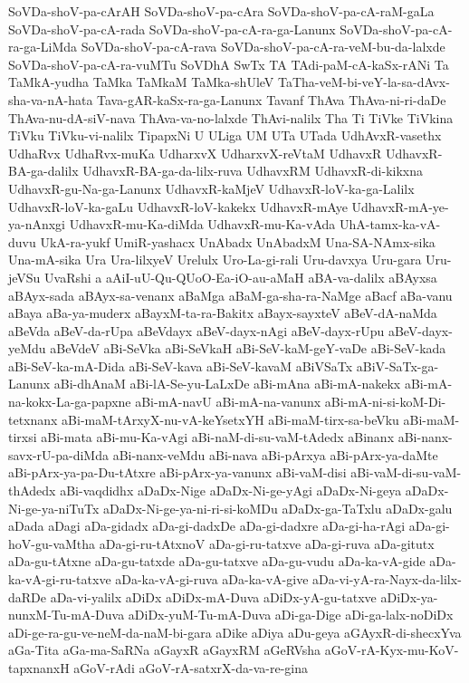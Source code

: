 {SoVDa-shoV-pa-cArAH
SoVDa-shoV-pa-cAra
SoVDa-shoV-pa-cA-raM-gaLa
SoVDa-shoV-pa-cA-rada
SoVDa-shoV-pa-cA-ra-ga-Lanunx
SoVDa-shoV-pa-cA-ra-ga-LiMda
SoVDa-shoV-pa-cA-rava
SoVDa-shoV-pa-cA-ra-veM-bu-da-lalxde
SoVDa-shoV-pa-cA-ra-vuMTu
SoVDhA
SwTx
TA
TAdi-paM-cA-kaSx-rANi
Ta
TaMkA-yudha
TaMka
TaMkaM
TaMka-shUleV
TaTha-veM-bi-veY-la-sa-dAvx-sha-va-nA-hata
Tava-gAR-kaSx-ra-ga-Lanunx
Tavanf
ThAva
ThAva-ni-ri-daDe
ThAva-nu-dA-siV-nava
ThAva-va-no-lalxde
ThAvi-nalilx
Tha
Ti
TiVke
TiVkina
TiVku
TiVku-vi-nalilx
TipapxNi
U
ULiga
UM
UTa
UTada
UdhAvxR-vasethx
UdhaRvx
UdhaRvx-muKa
UdharxvX
UdharxvX-reVtaM
UdhavxR
UdhavxR-BA-ga-dalilx
UdhavxR-BA-ga-da-lilx-ruva
UdhavxRM
UdhavxR-di-kikxna
UdhavxR-gu-Na-ga-Lanunx
UdhavxR-kaMjeV
UdhavxR-loV-ka-ga-Lalilx
UdhavxR-loV-ka-gaLu
UdhavxR-loV-kakekx
UdhavxR-mAye
UdhavxR-mA-ye-ya-nAnxgi
UdhavxR-mu-Ka-diMda
UdhavxR-mu-Ka-vAda
UhA-tamx-ka-vA-duvu
UkA-ra-yukf
UmiR-yashacx
UnAbadx
UnAbadxM
Una-SA-NAmx-sika
Una-mA-sika
Ura
Ura-lilxyeV
Urelulx
Uro-La-gi-rali
Uru-davxya
Uru-gara
Uru-jeVSu
UvaRshi
a
aAiI-uU-Qu-QUoO-Ea-iO-au-aMaH
aBA-va-dalilx
aBAyxsa
aBAyx-sada
aBAyx-sa-venanx
aBaMga
aBaM-ga-sha-ra-NaMge
aBacf
aBa-vanu
aBaya
aBa-ya-muderx
aBayxM-ta-ra-Bakitx
aBayx-sayxteV
aBeV-dA-naMda
aBeVda
aBeV-da-rUpa
aBeVdayx
aBeV-dayx-nAgi
aBeV-dayx-rUpu
aBeV-dayx-yeMdu
aBeVdeV
aBi-SeVka
aBi-SeVkaH
aBi-SeV-kaM-geY-vaDe
aBi-SeV-kada
aBi-SeV-ka-mA-Dida
aBi-SeV-kava
aBi-SeV-kavaM
aBiVSaTx
aBiV-SaTx-ga-Lanunx
aBi-dhAnaM
aBi-lA-Se-yu-LaLxDe
aBi-mAna
aBi-mA-nakekx
aBi-mA-na-kokx-La-ga-papxne
aBi-mA-navU
aBi-mA-na-vanunx
aBi-mA-ni-si-koM-Di-tetxnanx
aBi-maM-tArxyX-nu-vA-keYsetxYH
aBi-maM-tirx-sa-beVku
aBi-maM-tirxsi
aBi-mata
aBi-mu-Ka-vAgi
aBi-naM-di-su-vaM-tAdedx
aBinanx
aBi-nanx-savx-rU-pa-diMda
aBi-nanx-veMdu
aBi-nava
aBi-pArxya
aBi-pArx-ya-daMte
aBi-pArx-ya-pa-Du-tAtxre
aBi-pArx-ya-vanunx
aBi-vaM-disi
aBi-vaM-di-su-vaM-thAdedx
aBi-vaqdidhx
aDaDx-Nige
aDaDx-Ni-ge-yAgi
aDaDx-Ni-geya
aDaDx-Ni-ge-ya-niTuTx
aDaDx-Ni-ge-ya-ni-ri-si-koMDu
aDaDx-ga-TaTxlu
aDaDx-galu
aDada
aDagi
aDa-gidadx
aDa-gi-dadxDe
aDa-gi-dadxre
aDa-gi-ha-rAgi
aDa-gi-hoV-gu-vaMtha
aDa-gi-ru-tAtxnoV
aDa-gi-ru-tatxve
aDa-gi-ruva
aDa-gitutx
aDa-gu-tAtxne
aDa-gu-tatxde
aDa-gu-tatxve
aDa-gu-vudu
aDa-ka-vA-gide
aDa-ka-vA-gi-ru-tatxve
aDa-ka-vA-gi-ruva
aDa-ka-vA-give
aDa-vi-yA-ra-Nayx-da-lilx-daRDe
aDa-vi-yalilx
aDiDx
aDiDx-mA-Duva
aDiDx-yA-gu-tatxve
aDiDx-ya-nunxM-Tu-mA-Duva
aDiDx-yuM-Tu-mA-Duva
aDi-ga-Dige
aDi-ga-lalx-noDiDx
aDi-ge-ra-gu-ve-neM-da-naM-bi-gara
aDike
aDiya
aDu-geya
aGAyxR-di-shecxYva
aGa-Tita
aGa-ma-SaRNa
aGayxR
aGayxRM
aGeRVsha
aGoV-rA-Kyx-mu-KoV-tapxnanxH
aGoV-rAdi
aGoV-rA-satxrX-da-va-re-gina
}

